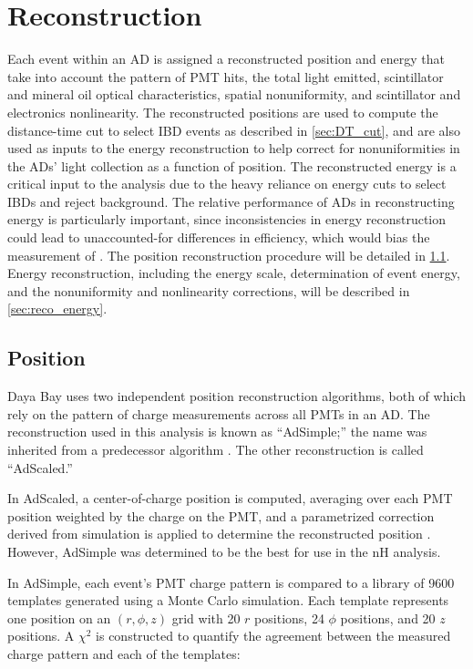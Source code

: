 \chapter{Reconstruction}
\label{ch:reconstruction}

Each event within an AD is assigned a reconstructed position and energy
that take into account the pattern of PMT hits, the total light emitted,
scintillator and mineral oil optical characteristics,
spatial nonuniformity, and scintillator and electronics nonlinearity.
The reconstructed positions are used to compute the distance-time cut
to select IBD events as described in \cref{sec:DT_cut},
and are also used as inputs to the energy reconstruction
to help correct for nonuniformities in the ADs' light collection
as a function of position.
The reconstructed energy is a critical input to the \thetaot{} analysis
due to the heavy reliance on energy cuts to select IBDs and reject background.
The relative performance of ADs in reconstructing energy
is particularly important, since inconsistencies in energy reconstruction
could lead to unaccounted-for differences in efficiency,
which would bias the measurement of \thetaot.
The position reconstruction procedure will be detailed in \cref{sec:reco_position}.
Energy reconstruction, including the energy scale, determination of event energy,
and the nonuniformity and nonlinearity corrections,
will be described in \cref{sec:reco_energy}.

\section{Position}
\label{sec:reco_position}

Daya Bay uses two independent position reconstruction algorithms,
both of which rely on the pattern of charge measurements across all PMTs in an AD.
The reconstruction used in this \thetaot{} analysis is known as ``AdSimple;''
the name was inherited from a predecessor algorithm \cite{adsimple1}.
The other reconstruction is called ``AdScaled.''

In AdScaled, a center-of-charge position is computed,
averaging over each PMT position weighted by the charge on the PMT,
and a parametrized correction derived from simulation
is applied to determine the reconstructed position \cite{ngd2016}.
However, AdSimple was determined to be the best for use in the nH analysis.

In AdSimple,
each event's PMT charge pattern is compared to a library of \num{9600} templates
generated using a Monte Carlo simulation.
Each template represents one position on an $(r, \phi, z)$ grid
with \num{20} $r$ positions, \num{24} $\phi$ positions,
and \num{20} $z$ positions.
A $\chi^2$ is constructed to quantify the agreement between the measured charge pattern
and each of the templates:

